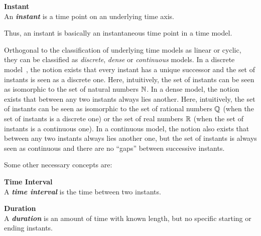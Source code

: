 \begin{svgraybox}
\vspace{-10pt}
\begin{definition}\textbf{Instant}~\cite{Dyreson1994}\\
An \emph{\textbf{instant}} is a time point on an underlying time axis.
\end{definition}
\vspace{-10pt}
\end{svgraybox}

Thus, an instant is basically an instantaneous time point in a time model.

Orthogonal to the classification of underlying time models as linear or cyclic, they can be classified as \emph{discrete}, \emph{dense} or \emph{continuous} models\cite{Dyreson1994}. In a discrete model~\cite{Clifford:1985:AHR:971699.318922}, the notion exists that every instant has a unique successor and the set of instants is seen as a discrete one. Here, intuitively, the set of instants can be seen as isomorphic to the set of natural numbers $\mathbb{N}$. In a dense model, the notion exists that between any two instants always lies another. Here, intuitively, the set of instants can be seen as isomorphic to the set of rational numbers $\mathbb{Q}$ (when the set of instants is a discrete one) or the set of real numbers $\mathbb{R}$ (when the set of instants is a continuous one). In a continuous model, the notion also exists that between any two instants always lies another one, but the set of instants is always seen as continuous and there are no ``gaps'' between successive instants.

Some other necessary concepts are: 

\begin{svgraybox}
\vspace{-10pt}
\begin{definition}\textbf{Time Interval}~\cite{Dyreson1994}\\
A \emph{\textbf{time interval}} is the time between two instants.
\end{definition}

\begin{definition}\textbf{Duration}~\cite{Dyreson1994}\\
A \emph{\textbf{duration}} is an amount of time with known length, but no specific starting or ending instants.
\end{definition}
\vspace{-10pt}
\end{svgraybox}

